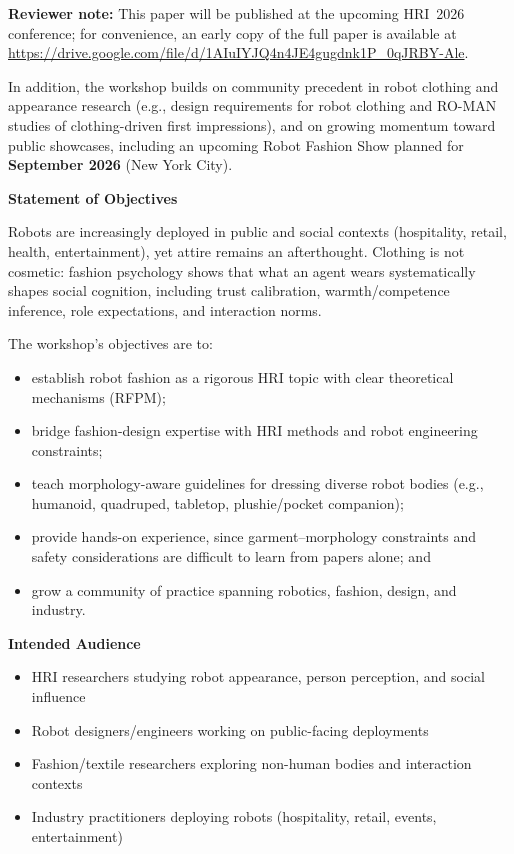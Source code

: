 \documentclass[12pt,letterpaper]{article}
\newcommand{\FormSection}[1]{\par\vspace{0.75\baselineskip}\noindent\textbf{#1}\par}
\newcommand{\FormBlockSep}{\par\vspace{0.5\baselineskip}}
\begin{document}
\FormBlockSep
\textbf{Reviewer note:} This paper will be published at the upcoming HRI~2026 conference; for convenience, an early copy of the full paper is available at \href{https://drive.google.com/file/d/1AIuIYJQ4n4JE4gugdnk1P_0qJRBY-Ale}{https://drive.google.com/file/d/1AIuIYJQ4n4JE4gugdnk1P\_0qJRBY-Ale}.

\FormBlockSep
In addition, the workshop builds on community precedent in robot clothing and appearance research (e.g., design requirements for robot clothing and RO-MAN studies of clothing-driven first impressions), and on growing momentum toward public showcases, including an upcoming Robot Fashion Show planned for \textbf{September 2026} (New York City).

\FormSection{Statement of Objectives}
Robots are increasingly deployed in public and social contexts (hospitality, retail, health, entertainment), yet attire remains an afterthought. Clothing is not cosmetic: fashion psychology shows that what an agent wears systematically shapes social cognition, including trust calibration, warmth/competence inference, role expectations, and interaction norms.

The workshop's objectives are to:
\begin{itemize}
  \item establish robot fashion as a rigorous HRI topic with clear theoretical mechanisms (RFPM);
  \item bridge fashion-design expertise with HRI methods and robot engineering constraints;
  \item teach morphology-aware guidelines for dressing diverse robot bodies (e.g., humanoid, quadruped, tabletop, plushie/pocket companion);
  \item provide hands-on experience, since garment--morphology constraints and safety considerations are difficult to learn from papers alone; and
  \item grow a community of practice spanning robotics, fashion, design, and industry.
\end{itemize}

\FormSection{Intended Audience}
\begin{itemize}
  \item HRI researchers studying robot appearance, person perception, and social influence
  \item Robot designers/engineers working on public-facing deployments
  \item Fashion/textile researchers exploring non-human bodies and interaction contexts
  \item Industry practitioners deploying robots (hospitality, retail, events, entertainment)
\end{itemize}
\end{document}
